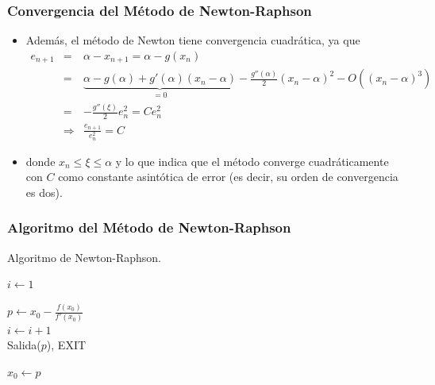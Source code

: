 \documentclass{beamer}
\begin{document}
\begin{frame}
  \frametitle{Convergencia del M\'etodo de Newton-Raphson}
  \begin{itemize}
    \item<1-> Adem\'as, el m\'etodo de Newton tiene convergencia cuadr\'atica, ya que
    \small{
    \begin{eqnarray}
    \nonumber e_{n+1} & = & \alpha - x_{n+1} = \alpha - g(x_n)\\
    \nonumber & = & \underbrace{\alpha -g(\alpha)+g'(\alpha)(x_n-\alpha)}_{=0} - \frac{g''(\alpha)}{2}(x_n -
    \alpha)^2 - O((x_n - \alpha)^3)\\
    \nonumber & = & - \frac{g''(\xi)}{2}e_n^2 = Ce_n^2\\
    \nonumber & \Rightarrow & \frac{e_{n+1}}{e_n^2}  =  C
    \end{eqnarray}}
    \item<2-> donde $x_n \leq \xi \leq \alpha$ y lo que indica que el m\'etodo converge cuadr\'aticamente con $C$ como constante
    asint\'otica de error (es decir, su orden de convergencia es dos).
    \end{itemize}
  \end{frame}     
\begin{frame}
  \frametitle{Algoritmo del M\'etodo de Newton-Raphson}
  \begin{algorithm}[H]
    \caption{Algoritmo de Newton-Raphson.}
    $i \leftarrow 1$\\
    {
     $\displaystyle p \leftarrow x_0-\frac{f(x_0)}{f'(x_0)}$\\
     $i \leftarrow i +1$\\
     {
       Salida($p$), \quad    EXIT\\
     }
     
     $x_0  \leftarrow p$\\
    }
    \label{PF_alg}
   \end{algorithm}
\end{frame}
\end{document}
